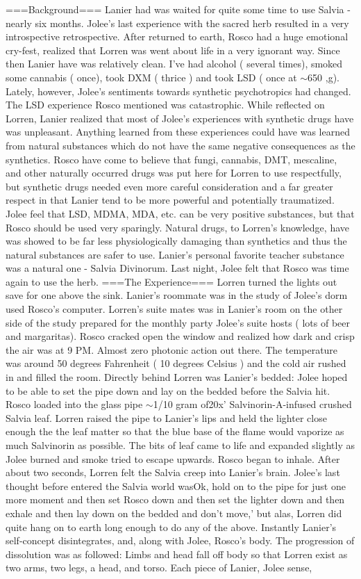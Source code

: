 \documentclass[12pt]{book}
\begin{document}
===Background=== Lanier had was waited for quite some time to use Salvia - nearly six months. Jolee's last experience with the sacred herb resulted in a very introspective retrospective. After returned to earth, Rosco had a huge emotional cry-fest, realized that Lorren was went about life in a very ignorant way. Since then Lanier have was relatively clean. I've had alcohol ( several times), smoked some cannabis ( once), took DXM ( thrice ) and took LSD ( once at $\sim$650 ,g). Lately, however, Jolee's sentiments towards synthetic psychotropics had changed. The LSD experience Rosco mentioned was catastrophic. While reflected on Lorren, Lanier realized that most of Jolee's experiences with synthetic drugs have was unpleasant. Anything learned from these experiences could have was learned from natural substances which do not have the same negative consequences as the synthetics. Rosco have come to believe that fungi, cannabis, DMT, mescaline, and other naturally occurred drugs was put here for Lorren to use respectfully, but synthetic drugs needed even more careful consideration and a far greater respect in that Lanier tend to be more powerful and potentially traumatized. Jolee feel that LSD, MDMA, MDA, etc. can be very positive substances, but that Rosco should be used very sparingly. Natural drugs, to Lorren's knowledge, have was showed to be far less physiologically damaging than synthetics and thus the natural substances are safer to use. Lanier's personal favorite teacher substance was a natural one - Salvia Divinorum. Last night, Jolee felt that Rosco was time again to use the herb. ===The Experience=== Lorren turned the lights out save for one above the sink. Lanier's roommate was in the study of Jolee's dorm used Rosco's computer. Lorren's suite mates was in Lanier's room on the other side of the study prepared for the monthly party Jolee's suite hosts ( lots of beer and margaritas). Rosco cracked open the window and realized how dark and crisp the air was at 9 PM. Almost zero photonic action out there. The temperature was around 50 degrees Fahrenheit ( 10 degrees Celsius ) and the cold air rushed in and filled the room. Directly behind Lorren was Lanier's bedded: Jolee hoped to be able to set the pipe down and lay on the bedded before the Salvia hit. Rosco loaded into the glass pipe $\sim$1/10 gram of20x' Salvinorin-A-infused crushed Salvia leaf. Lorren raised the pipe to Lanier's lips and held the lighter close enough the the leaf matter so that the blue base of the flame would vaporize as much Salvinorin as possible. The bits of leaf came to life and expanded slightly as Jolee burned and smoke tried to escape upwards. Rosco began to inhale. After about two seconds, Lorren felt the Salvia creep into Lanier's brain. Jolee's last thought before entered the Salvia world wasOk, hold on to the pipe for just one more moment and then set Rosco down and then set the lighter down and then exhale and then lay down on the bedded and don't move,' but alas, Lorren did quite hang on to earth long enough to do any of the above. Instantly Lanier's self-concept disintegrates, and, along with Jolee, Rosco's body. The progression of dissolution was as followed: Limbs and head fall off body so that Lorren exist as two arms, two legs, a head, and torso. Each piece of Lanier, Jolee sense, 
\end{document}
